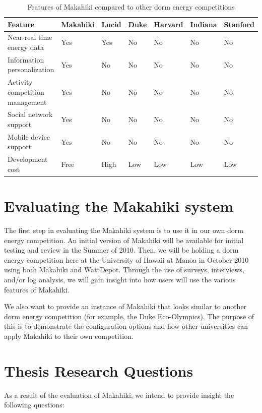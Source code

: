 \begin{table}[h]
	\begin{tabular}{| l || l | l | l | l | l | l | }
		\hline
		Feature & Makahiki & Lucid & Duke & Harvard & Indiana & Stanford \\
		\hline
		Near-real time energy data & Yes & Yes & No & No & No & No \\
		Information personalization & Yes & No & No & No & No & No \\
		Activity competition management & Yes & No & No & No & No & No\\
		Social network support & Yes & No & No & No & No & No\\
		Mobile device support & Yes & No & No & No & No & No \\
		Development cost & Free & High & Low & Low & Low & Low \\
		\hline
	\end{tabular}
	\caption{Features of Makahiki compared to other dorm energy competitions}
	\label{feature-comparison}
\end{table}

\section{Evaluating the Makahiki system}

The first step in evaluating the Makahiki system is to use it in our own dorm energy competition.  An initial version of Makahiki will be available for initial testing and review in the Summer of 2010.  Then, we will be holding a dorm energy competition here at the University of Hawaii at Manoa in October 2010 using both Makahiki and WattDepot.  Through the use of surveys, interviews, and/or log analysis, we will gain insight into how users will use the various features of Makahiki.

We also want to provide an instance of Makahiki that looks similar to another dorm energy competition (for example, the Duke Eco-Olympics).  The purpose of this is to demonstrate the configuration options and how other universities can apply Makahiki to their own competition.

\section{Thesis Research Questions}

As a result of the evaluation of Makahiki, we intend to provide insight the following questions:

